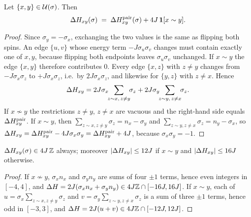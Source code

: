 \begin{proposition}\label{prop:delta}
Let $\{x,y\}\in\mathcal{U}(\sigma)$. Then
\begin{equation}
\Delta H_{xy}(\sigma)\;=\;\Delta H^{\mathrm{pair}}_{xy}(\sigma)+4J\,\mathbf{1}[x\sim y].
\label{eq:delta}
\end{equation}
\end{proposition}
\begin{proof}
Since $\sigma_y=-\sigma_x$, exchanging the two values is the same as flipping both spins. An edge $\{u,v\}$ whose energy term $-J\sigma_u\sigma_v$ changes must contain exactly one of $x,y$, because flipping both endpoints leaves $\sigma_u\sigma_v$ unchanged. If $x\sim y$ the edge $\{x,y\}$ therefore contributes $0$. Every edge $\{x,z\}$ with $z\ne y$ changes from $-J\sigma_x\sigma_z$ to $+J\sigma_x\sigma_z$, i.e.\ by $2J\sigma_x\sigma_z$, and likewise for $\{y,z\}$ with $z\neq x$. Hence
\[
\Hdel_{xy}=2J\sigma_x\!\!\sum_{z\sim x,\,z\ne y}\!\!\sigma_z+2J\sigma_y\!\!\sum_{z\sim y,\,z\ne x}\!\!\sigma_z .
\]
If $x\not\sim y$ the restrictions $z\ne y$, $z\ne x$ are vacuous and the right-hand side equals $\Delta H^{\mathrm{pair}}_{xy}$. If $x\sim y$, then $\sum_{z\sim x,z\ne y}\sigma_z=n_x-\sigma_y$ and $\sum_{z\sim y,z\ne x}\sigma_z=n_y-\sigma_x$, so $\Delta H_{xy}=\Delta H^{\mathrm{pair}}_{xy}-4J\sigma_x\sigma_y=\Delta H^{\mathrm{pair}}_{xy}+4J$, because $\sigma_x\sigma_y=-1$.
\end{proof}

\begin{corollary}\label{cor:values}
$\Delta H_{xy}(\sigma)\in 4J\,\mathbb{Z}$ always; moreover $|\Delta H_{xy}|\le 12J$ if $x\sim y$ and $|\Delta H_{xy}|\le 16J$ otherwise.
\end{corollary}
\begin{proof}
If $x\not\sim y$, $\sigma_xn_x$ and $\sigma_yn_y$ are sums of four $\pm1$ terms, hence even integers in $[-4,4]$, and $\Delta H=2J(\sigma_xn_x+\sigma_yn_y)\in 4J\mathbb{Z}\cap[-16J,16J]$. If $x\sim y$, each of $u=\sigma_x\sum_{z\sim x,z\ne y}\sigma_z$ and $v=\sigma_y\sum_{z\sim y,z\ne x}\sigma_z$ is a sum of three $\pm1$ terms, hence odd in $[-3,3]$, and $\Delta H=2J(u+v)\in4J\mathbb{Z}\cap[-12J,12J]$.
\end{proof}


